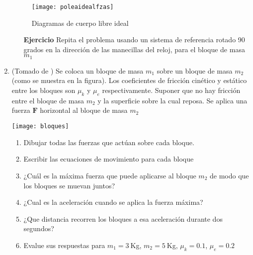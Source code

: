 \begin{enumerate}
\begin{figure}
    \centering
    \texttt{[image: poleaidealfzas]}
    \caption{Diagramas de cuerpo libre ideal}
    \label{fig:poleaidealfzas}
  \end{figure}
  \begin{itemize}
  \item[\textbf{Ejercicio}] Repita el problema usando un sistema de referencia rotado 90 grados en la dirección de las manecillas del reloj, para el bloque de masa $m_1$
  \end{itemize}
\item  (Tomado de \cite{gabriel}) Se coloca un bloque de masa $m_1$ sobre un bloque de masa $m_2$ (como se muestra en la figura). Los coeficientes de fricción cinético y estático entre los bloques son $\mu_k$ y $\mu_e$ respectivamente. Suponer que no hay fricción entre el bloque de masa $m_2$ y la superficie sobre la cual reposa. Se aplica una fuerza $\mathbf{F}$ horizontal al bloque de masa $m_2$

  \begin{minipage}{0.4\linewidth}
    \texttt{[image: bloques]}
  \end{minipage}
  \begin{minipage}{0.6\linewidth}
    \begin{enumerate}
    \item Dibujar todas las fuerzas que actúan sobre cada bloque.
      \label{item:d1a}
    \item Escribir las ecuaciones de movimiento para cada bloque
      \label{item:d1b}
    \item ¿Cuál es la máxima fuerza que puede aplicarse al bloque $m_2$ de modo que los bloques se muevan juntos?
      \label{item:d1c}
    \item ¿Cual es la aceleración cuando se aplica la fuerza máxima?
      \label{item:d1d}
    \item ¿Que distancia recorren los bloques a esa aceleración durante dos segundos?
      \label{item:d1e}
    \item Evalue sus respuestas para $m_1=3\ $Kg, $m_2=5\ $Kg, $\mu_k=0.1$, $\mu_e=0.2$
      \label{item:d1f}
    \end{enumerate}
  \end{minipage}


\end{enumerate}
